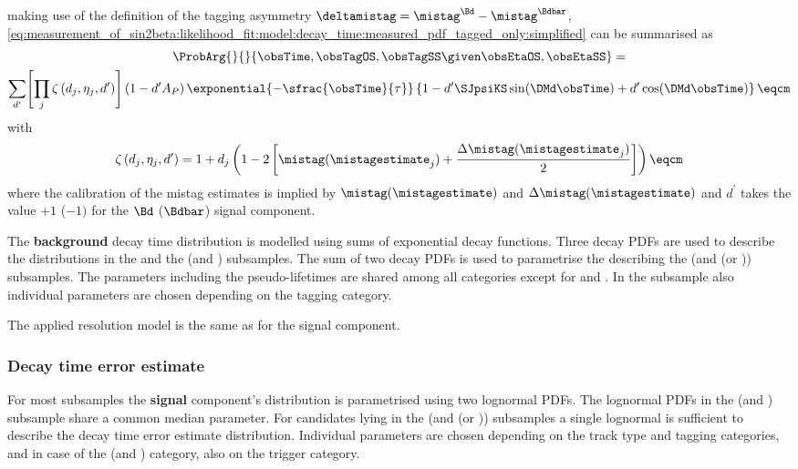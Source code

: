 making use of the definition of the tagging asymmetry $\deltamistag =
\mistag^{\Bd} - \mistag^{\Bdbar}$, 
\cref{eq:measurement_of_sin2beta:likelihood_fit:model:decay_time:measured_pdf_tagged_only:simplified} 
can be summarised as
%
\begin{multline}
  \ProbArg{}{}{\obsTime, \obsTagOS, \obsTagSS \given \obsEtaOS, \obsEtaSS} = \\
  \sum_{d^\prime} \Biggl[ \prod_{j} \zeta \left( d_j, \eta_j, d^\prime \right) \Biggr] \left( 1 - d^\prime A_P \right) \exponential{-\sfrac{\obsTime}{\tau}} \left\{ 1 - d^\prime \SJpsiKS \sin (\DMd \obsTime) + d^\prime \cos (\DMd \obsTime) \right\} \eqcm
\end{multline}
%
with
%
\begin{equation}
  \zeta \left( d_j, \eta_j, d^\prime \right) = 1 + d_j \left( 1 - 2 \left[ \mistag(\mistagestimate_j) + \frac{\Delta\mistag(\mistagestimate_j)}{2} \right] \right) \eqcm
\end{equation}
%
where the calibration of the mistag estimates is implied by
$\mistag(\mistagestimate)$ and $\Delta\mistag(\mistagestimate)$ and $d^\prime$
takes the value $+1$ ($-1)$ for the $\Bd$ ($\Bdbar$) signal component.

The \textbf{background} decay time distribution is modelled using sums of
exponential decay functions. Three decay \acp{PDF} are used to describe the
distributions in the \catLL and the (\catDD and \catOS) subsamples. The sum of
two decay \acp{PDF} is used to parametrise the \PDF describing the (\catDD and
(\catSS or \catBS)) subsamples. The \PDF parameters including the
pseudo-lifetimes are shared among all categories except for \catDD and \catLL.
In the \catDD subsample also individual parameters are chosen depending on the
tagging category. 

The applied resolution model is the same as for the signal component.

\subsubsection{Decay time error estimate}
\label{sec:measurement_of_sin2beta:likelihood_fit:model:decay_time_error}

For most subsamples the \textbf{signal} component's distribution is parametrised
using two lognormal \acp{PDF}. The lognormal \acp{PDF} in the (\catLL and
\catOS) subsample share a common median parameter. For candidates lying in the
(\catLL and (\catSS or \catBS)) subsamples a single lognormal \PDF is sufficient
to describe the decay time error estimate distribution. Individual parameters
are chosen depending on the track type and tagging categories, and in case of
the (\catDD and \catOS) category, also on the trigger category.

